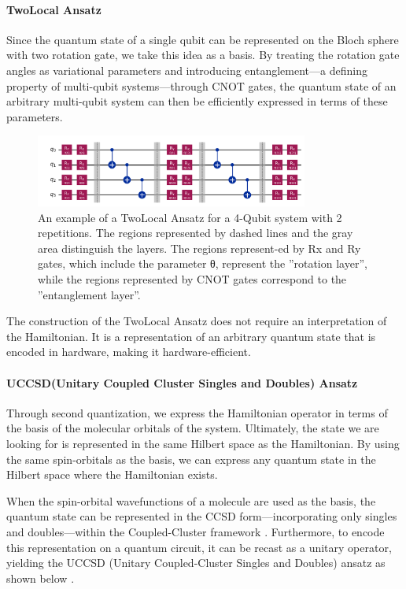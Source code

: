 \documentclass[pdflatex,sn-mathphys-num]{sn-jnl}%
\theoremstyle{thmstyleone}%
\theoremstyle{thmstyletwo}%
\theoremstyle{thmstylethree}%
\begin{document}
\paragraph{TwoLocal Ansatz} \leavevmode \newline
Since the quantum state of a single qubit can be represented on the Bloch sphere with two rotation gate, we take this idea as a basis. By treating the rotation gate angles as variational parameters and introducing entanglement—a defining property of multi-qubit systems—through CNOT gates, the quantum state of an arbitrary multi-qubit system can then be efficiently expressed in terms of these parameters\cite{TL1}.

\begin{figure}[htbp]
\centering
\includegraphics[width=0.8\textwidth]{fig/twolocal.png}
\caption{An example of a TwoLocal Ansatz for a 4-Qubit system with 2 repetitions. The regions represented by dashed lines and the gray area distinguish the layers. The regions represent-ed by Rx and Ry gates, which include the parameter θ, represent the ''rotation layer'', while the regions represented by CNOT gates correspond to the ''entanglement layer''.}\label{Fig.3}
\end{figure}
The construction of the TwoLocal Ansatz does not require an interpretation of the Hamiltonian. It is a representation of an arbitrary quantum state that is encoded in hardware, making it hardware-efficient.

\paragraph{UCCSD(Unitary Coupled Cluster Singles and Doubles) Ansatz} \leavevmode \newline
Through second quantization, we express the Hamiltonian operator in terms of the basis of the molecular orbitals of the system. Ultimately, the state we are looking for is represented in the same Hilbert space as the Hamiltonian. By using the same spin-orbitals as the basis, we can express any quantum state in the Hilbert space where the Hamiltonian exists. 

When the spin-orbital wavefunctions of a molecule are used as the basis, the quantum state can be represented in the CCSD form—incorporating only singles and doubles—within the Coupled-Cluster framework \cite{CC1,CC2}. Furthermore, to encode this representation on a quantum circuit, it can be recast as a unitary operator, yielding the UCCSD (Unitary Coupled-Cluster Singles and Doubles) ansatz as shown below \cite{UCC1,UCC2}.
\end{document}
